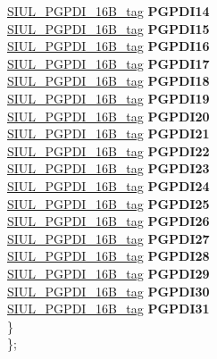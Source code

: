 \begin{DoxyCompactItemize}
\begin{tabbing}
\>\>\mbox{\hyperlink{unionSIUL__PGPDI__16B__tag}{SIUL\_PGPDI\_16B\_tag}} {\bfseries PGPDI14}\\
\>\>\mbox{\hyperlink{unionSIUL__PGPDI__16B__tag}{SIUL\_PGPDI\_16B\_tag}} {\bfseries PGPDI15}\\
\>\>\mbox{\hyperlink{unionSIUL__PGPDI__16B__tag}{SIUL\_PGPDI\_16B\_tag}} {\bfseries PGPDI16}\\
\>\>\mbox{\hyperlink{unionSIUL__PGPDI__16B__tag}{SIUL\_PGPDI\_16B\_tag}} {\bfseries PGPDI17}\\
\>\>\mbox{\hyperlink{unionSIUL__PGPDI__16B__tag}{SIUL\_PGPDI\_16B\_tag}} {\bfseries PGPDI18}\\
\>\>\mbox{\hyperlink{unionSIUL__PGPDI__16B__tag}{SIUL\_PGPDI\_16B\_tag}} {\bfseries PGPDI19}\\
\>\>\mbox{\hyperlink{unionSIUL__PGPDI__16B__tag}{SIUL\_PGPDI\_16B\_tag}} {\bfseries PGPDI20}\\
\>\>\mbox{\hyperlink{unionSIUL__PGPDI__16B__tag}{SIUL\_PGPDI\_16B\_tag}} {\bfseries PGPDI21}\\
\>\>\mbox{\hyperlink{unionSIUL__PGPDI__16B__tag}{SIUL\_PGPDI\_16B\_tag}} {\bfseries PGPDI22}\\
\>\>\mbox{\hyperlink{unionSIUL__PGPDI__16B__tag}{SIUL\_PGPDI\_16B\_tag}} {\bfseries PGPDI23}\\
\>\>\mbox{\hyperlink{unionSIUL__PGPDI__16B__tag}{SIUL\_PGPDI\_16B\_tag}} {\bfseries PGPDI24}\\
\>\>\mbox{\hyperlink{unionSIUL__PGPDI__16B__tag}{SIUL\_PGPDI\_16B\_tag}} {\bfseries PGPDI25}\\
\>\>\mbox{\hyperlink{unionSIUL__PGPDI__16B__tag}{SIUL\_PGPDI\_16B\_tag}} {\bfseries PGPDI26}\\
\>\>\mbox{\hyperlink{unionSIUL__PGPDI__16B__tag}{SIUL\_PGPDI\_16B\_tag}} {\bfseries PGPDI27}\\
\>\>\mbox{\hyperlink{unionSIUL__PGPDI__16B__tag}{SIUL\_PGPDI\_16B\_tag}} {\bfseries PGPDI28}\\
\>\>\mbox{\hyperlink{unionSIUL__PGPDI__16B__tag}{SIUL\_PGPDI\_16B\_tag}} {\bfseries PGPDI29}\\
\>\>\mbox{\hyperlink{unionSIUL__PGPDI__16B__tag}{SIUL\_PGPDI\_16B\_tag}} {\bfseries PGPDI30}\\
\>\>\mbox{\hyperlink{unionSIUL__PGPDI__16B__tag}{SIUL\_PGPDI\_16B\_tag}} {\bfseries PGPDI31}\\
\>\} \\
\}; \\


\end{tabbing}
\end{DoxyCompactItemize}
